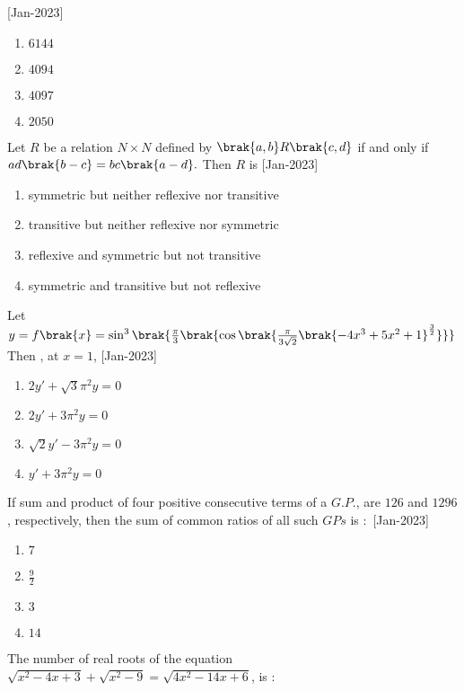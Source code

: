     \hfill{[Jan-2023]}
        \begin{enumerate}
            \item $6144$
            \item $4094$
            \item $4097$
            \item $2050$
        \end{enumerate}
    \item Let $R$ be a relation $N\times N$ defined by $\brak{a,b}R\brak{c,d}$ if and only if $ad\brak{b-c}=bc\brak{a-d}.$ Then $R$ is 
    \hfill{[Jan-2023]}
        \begin{enumerate}
            \item symmetric but neither reflexive nor transitive
            \item transitive but neither reflexive nor symmetric
            \item reflexive and symmetric but not transitive
            \item symmetric and transitive but not reflexive 
        \end{enumerate}
    \item Let \\
        $y=f\brak{x}=\sin^{3}\brak{\frac{\pi}{3}\brak{\cos{\brak{\frac{\pi}{3\sqrt{2}}\brak{-4x^3+5x^2+1}^{\frac{3}{2}}}}}}$\\
        Then , at $x=1$,
        \hfill{[Jan-2023]}
            \begin{enumerate}
                \item $2y\prime +\sqrt{3}\pi^2y=0$
                \item $2y\prime+3\pi^2y=0$
                \item $\sqrt{2}y\prime-3\pi^2y=0$
                \item $y\prime+3\pi^2y=0$
            \end{enumerate}
    \item If sum and product of four positive consecutive terms of a $G.P.$, are $126$ and $1296$, respectively, then the sum of common ratios of all such $GPs$ is $\colon$
    \hfill{[Jan-2023]}
        \begin{enumerate}
            \item $7$
            \item $\frac{9}{2}$
            \item $3$
            \item $14$
        \end{enumerate}
    \item The number of real roots of the equation $\sqrt{x^2-4x+3}+\sqrt{x^2-9}=\sqrt{4x^2-14x+6}$, is $\colon$
